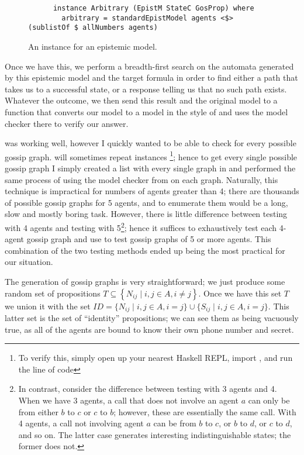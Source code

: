 \documentclass[10pt, a4paper]{report}
\begin{document}
\begin{figure}[h]
  \centering
  \begin{verbatim}
      instance Arbitrary (EpistM StateC GosProp) where
        arbitrary = standardEpistModel agents <$> (sublistOf $ allNumbers agents)
  \end{verbatim}
  \caption{An  instance for an epistemic model.}
  \label{fig:Arbitrary}
\end{figure}

Once we have this, we perform a breadth-first search on the automata generated
by this epistemic model and the target formula in order to find either a path
that takes us to a successful state, or a response telling us that no such path
exists. Whatever the outcome, we then send this result and the original model to
a function that converts our model to a model in the style of
\cite{GithubGossip} and uses the model checker there to verify our answer.

 was working well, however I quickly wanted to be able to check
for every possible gossip graph.  will sometimes repeat
instances \footnote{To verify this, simply open up your nearest Haskell REPL,
  import , and run the line of code }; hence to get every single
possible gossip graph I simply created a list with every single graph in and
performed the same process of using the model checker from \cite{GithubGossip}
on each graph. Naturally, this technique is impractical for numbers of agents
greater than 4; there are thousands of possible gossip graphs for 5 agents, and
to enumerate them would be a long, slow and mostly boring task. However, there
is little difference between testing with 4 agents and testing with
5\footnote{In contrast, consider the difference between testing with 3 agents
  and 4. When we have 3 agents, a call that does not involve an agent $a$ can
  only be from either $b$ to $c$ or $c$ to $b$; however, these are essentially
  the same call. With 4 agents, a call not involving agent $a$ can be from $b$
  to $c$, or $b$ to $d$, or $c$ to $d$, and so on. The latter case generates
  interesting indistinguishable states; the former does not.}; hence it suffices
to exhaustively test each 4-agent gossip graph and use  to test
gossip graphs of 5 or more agents. This combination of the two testing methods
ended up being the most practical for our situation.

The generation of gossip graphs is very straightforward; we just produce some
random set of propositions $T \subseteq \left\{ N_{ij} \mid i, j \in A, i \not = j
\right\}$. Once we have this set $T$ we union it with the set $ID = \{N_{ij} \mid i,
j \in A, i = j\} \cup \{S_{ij} \mid i, j \in A, i = j\}$. This latter set is the
set of ``identity'' propositions; we can see them as being vacuously true, as
all of the agents are bound to know their own phone number and secret.
\end{document}
